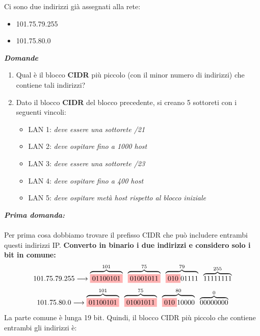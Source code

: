 \documentclass[a4paper]{article}
\begin{document}
Ci sono due indirizzi già assegnati alla rete:

\begin{itemize}
    \item 101.75.79.255
    \item 101.75.80.0
\end{itemize}
\textbf{\textit{Domande}}
\begin{enumerate}
    \item Qual è il blocco \textbf{CIDR} più piccolo (con il minor numero di indirizzi) che contiene tali indirizzi?
    \item Dato il blocco \textbf{CIDR} del blocco precedente, si creano 5 sottoreti con i seguenti vincoli:
    \begin{itemize}
        \item LAN 1: \textit{deve essere una sottorete /21}
        \item LAN 2: \textit{deve ospitare fino a 1000 host}
        \item LAN 3: \textit{deve essere una sottorete /23}
        \item LAN 4: \textit{deve ospitare fino a 400 host}
        \item LAN 5: \textit{deve ospitare metà host rispetto al blocco iniziale}
        
    \end{itemize}
\end{enumerate}
\textbf{\textit{Prima domanda:}}
\\\\
Per prima cosa dobbiamo trovare il prefisso CIDR che può includere entrambi questi indirizzi IP. 
\textbf{Converto in binario i due indirizzi e considero solo i bit in comune: }
\[101.75.79.255 \longrightarrow \overbrace{\colorbox{red!30!white}{01100101}}^{101} \; \; \overbrace{\colorbox{red!30!white}{01001011}}^{75} \; \; \overbrace{\colorbox{red!30!white}{010}01111}^{79} \; \; \overbrace{1111 1111}^{255}\]
\[101.75.80.0 \longrightarrow \overbrace{\colorbox{red!30!white}{01100101}}^{101} \; \; \overbrace{\colorbox{red!30!white}{01001011}}^{75} \; \; \overbrace{\colorbox{red!30!white}{010}10000}^{80} \; \; \overbrace{00000000}^{0}\]
La parte comune è lunga 19 bit. Quindi, il blocco CIDR più piccolo che contiene entrambi gli indirizzi è:
\end{document}
